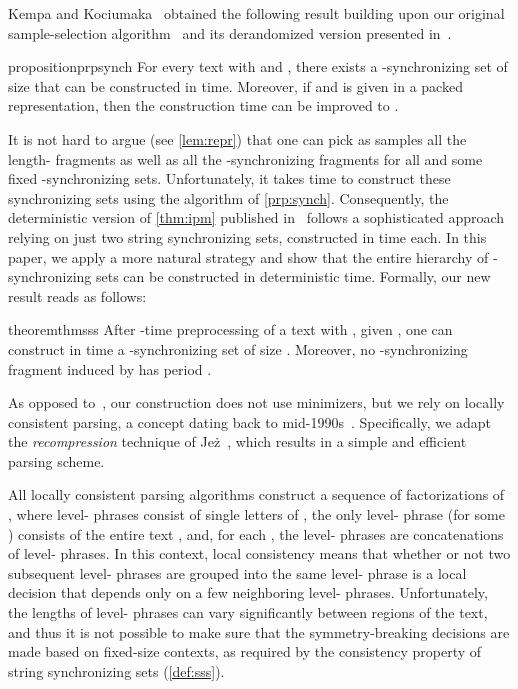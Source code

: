 \documentclass[a4paper]{article}
\theoremstyle{definition}
\theoremstyle{remark}
\begin{document}
Kempa and Kociumaka~\cite{Kempa2019} obtained the following result building upon our original sample-selection algorithm~\cite{DBLP:conf/soda/KociumakaRRW15}
and its derandomized version presented in~\cite{phd}.
\begin{restatable}{proposition}{prpsynch}\label{prp:synch}
For every text  with  and , there exists a -synchronizing set of size  that can be constructed in  time. Moreover, if  and  is given in a packed representation, then the construction time can be improved to .
\end{restatable}
It is not hard to argue (see \cref{lem:repr}) that one can pick as samples all the length- fragments as 
well as all the -synchronizing fragments for all  and some fixed -synchronizing sets.
Unfortunately, it takes  time to construct these synchronizing sets using the algorithm of \cref{prp:synch}.
Consequently, the deterministic version of \cref{thm:ipm} published in~\cite{phd} follows a sophisticated approach relying on just two string synchronizing sets, constructed in  time each.
In this paper, we apply a more natural strategy and show that the entire hierarchy of  -synchronizing sets
can be constructed in deterministic  time. Formally, our new result reads as follows:

\begin{restatable}{theorem}{thmsss}\label{thm:sss}
  After -time preprocessing of a text  with ,
  given , one can construct
  in  time a -synchronizing set  of size  .
  Moreover, no -synchronizing fragment induced by  has period .
\end{restatable}

As opposed to~\cite{Kempa2019}, our construction does not use minimizers, but we rely on 
locally consistent parsing, a concept dating back to mid-1990s~\cite{FirstConsistentParsing,SymmetryBreakingST,DBLP:conf/focs/SahinalpV96,DBLP:journals/algorithmica/MehlhornSU97}. Specifically, we adapt the \emph{recompression} technique of Jeż~\cite{DBLP:journals/talg/Jez15,DBLP:journals/jacm/Jez16},
which results in a simple and efficient parsing scheme.

All locally consistent parsing algorithms construct a sequence of factorizations of , where
level- phrases consist of single letters of , the only level- phrase (for some ) consists of the entire text ,
and, for each , the level- phrases are concatenations of level- phrases.
In this context, local consistency means that whether or not two subsequent level- phrases are grouped into the same level- phrase 
is a local decision that depends only on a few neighboring  level- phrases.
Unfortunately, the lengths of level- phrases can vary significantly between regions of the text, and thus it is not possible to make sure that the symmetry-breaking decisions are made based on fixed-size contexts, as required by the consistency property of string synchronizing sets (\cref{def:sss}).
\end{document}
